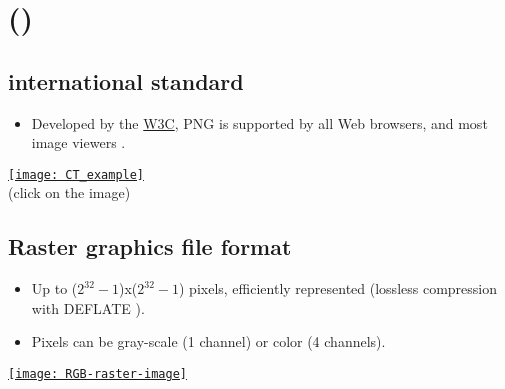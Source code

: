 \chapter{ ()}

\section{ international standard}
\begin{itemize}
\item Developed by the \href{https://www.w3.org/}{W3C}, \gls{PNG}
  \cite{roelofs1999png} is supported by all Web browsers, and most
  image viewers \cite{wikipedia_PNG}.
\end{itemize}
\begin{center}
  \href{https://upload.wikimedia.org/wikipedia/commons/0/05/CT_of_a_normal_abdomen_and_pelvis%2C_coronal_plane_79.png}{\texttt{[image: CT\_example]}}\\
     (click on the image)
\end{center}

\section{Raster graphics file format}
\begin{itemize}
\item Up to ($2^{32}-1$)x($2^{32}-1$) pixels, efficiently represented
  (lossless compression with DEFLATE \cite{deutsch1996deflate}).
\item Pixels can be gray-scale (1 channel) or color
   (4 channels).
\end{itemize}
\vspace{-4ex}
\begin{center}
  \href{https://en.wikipedia.org/wiki/Raster_graphics}{\texttt{[image: RGB-raster-image]}}
\end{center}

